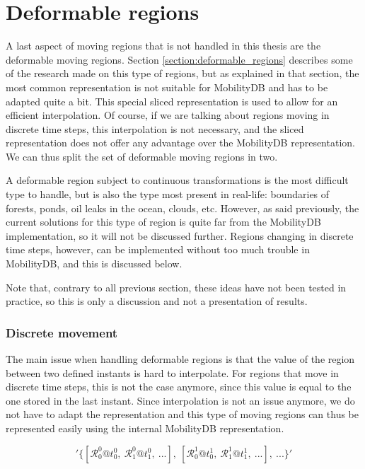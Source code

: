 
\section{Deformable regions}
\label{section:deformable}

A last aspect of moving regions that is not handled in this thesis are the deformable moving regions. Section \ref{section:deformable_regions} describes some of the research made on this type of regions, but as explained in that section, the most common representation is not suitable for MobilityDB and has to be adapted quite a bit. This special sliced representation is used to allow for an efficient interpolation. Of course, if we are talking about regions moving in discrete time steps, this interpolation is not necessary, and the sliced representation does not offer any advantage over the MobilityDB representation. We can thus split the set of deformable moving regions in two.

A deformable region subject to continuous transformations is the most difficult type to handle, but is also the type most present in real-life: boundaries of forests, ponds, oil leaks in the ocean, clouds, etc. However, as said previously, the current solutions for this type of region is quite far from the MobilityDB implementation, so it will not be discussed further. Regions changing in discrete time steps, however, can be implemented without too much trouble in MobilityDB, and this is discussed below.

Note that, contrary to all previous section, these ideas have not been tested in practice, so this is only a discussion and not a presentation of results.

\subsubsection{Discrete movement}

The main issue when handling deformable regions is that the value of the region between two defined instants is hard to interpolate. For regions that move in discrete time steps, this is not the case anymore, since this value is equal to the one stored in the last instant. Since interpolation is not an issue anymore, we do not have to adapt the representation and this type of moving regions can thus be represented easily using the internal MobilityDB representation. 

\[
    '\{[\mathcal{R}_0^0@t_0^0,\ \mathcal{R}_1^0@t_1^0,\ ...],\ [\mathcal{R}_0^1@t_0^1,\ \mathcal{R}_1^1@t_1^1,\ ...],\ ...\}'
\]

